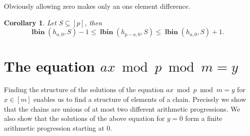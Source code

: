 \documentclass{article}
\newcommand{\lbin}[2]{\operatorname{\mathbf{lbin}}({#1}, {#2})}
\newtheorem{corollary}{Corollary}
\begin{document}
Obviously allowing zero makes only an one element difference.
\begin{corollary}
Let $S \subseteq [p]$, then
\[
\lbin{h_{a, 0}}{S} -1 \leq \lbin{h_{p - a, 0}}{S} \leq \lbin{h_{a, 0}}{S} + 1.
\]
\end{corollary}

\section{The equation $ax \bmod p \bmod m = y$}

Finding the structure of the solutions of the equation $ax \bmod p \bmod m = y$ for $x \in [m]$ enables us to find a structure of elements of a chain. 
Precisely we show that the chains are unions of at most two different arithmetic progressions. 
We also show that the solutions of the above equation for $y = 0$ form a finite arithmetic progression starting at $0$. 
\end{document}
